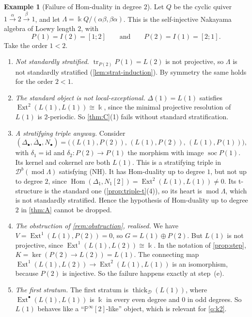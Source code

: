 \documentclass[11pt,reqno]{amsart}
\theoremstyle{plain}
\theoremstyle{definition}
\newtheorem{example}[theorem]{Example}
\theoremstyle{remark}
\newcommand{\kk}{\Bbbk}
\DeclareMathOperator{\Hom}{Hom}
\DeclareMathOperator{\Ext}{Ext}
\DeclareMathOperator{\soc}{soc}
\DeclareMathOperator{\tr}{tr}
\newcommand{\modd}{\operatorname{mod}}
\newcommand{\Db}{\mathcal{D}^b}
\newcommand{\thick}[2][\cD]{\operatorname{thick}_{#1}(#2)}
\newcommand{\Pn}[2]{\mathbb{P}^{#1}[#2]}
\newcommand{\Deltabar}{\overline{\Delta}}
\newcommand{\cD}{\mathcal{D}}
\begin{document}
\begin{example}[Failure of Hom-duality in degree $2$]\label{ex:nakayama}
Let $Q$ be the cyclic quiver $1\xrightarrow{\alpha}2\xrightarrow{\beta}1$, and let $\Lambda=\kk Q/(\alpha\beta,\beta\alpha)$. This is the self-injective Nakayama algebra of Loewy length $2$, with
\[P(1)=I(2)=[1;2]\qquad\text{and}\qquad P(2)=I(1)=[2;1].\]
Take the order $1<2$.
\begin{enumerate}
\item \emph{Not standardly stratified.} $\tr_{P(2)}P(1)=L(2)$ is not projective, so $\Lambda$ is not standardly stratified (\cref{lem:strat-induction}). By symmetry the same holds for the order $2<1$.
\item \emph{The standard object is not local-exceptional.} $\Delta(1)=L(1)$ satisfies $\Ext^2(L(1),L(1))\cong\kk$, since the minimal projective resolution of $L(1)$ is $2$-periodic. So \cref{thm:C}(1) fails without standard stratification.
\item \emph{A stratifying triple anyway.} Consider
\[(\Delta_\bullet,\Deltabar_\bullet,N_\bullet)=\big((L(1),P(2)),\,(L(1),P(2)),\,(L(1),P(1))\big),\]
with $\delta_1=\mathrm{id}$ and $\delta_2\colon P(2)\to P(1)$ the morphism with image $\soc P(1)$. Its kernel and cokernel are both $L(1)$. This is a stratifying triple in $\Db(\modd\Lambda)$ satisfying (NH). It has Hom-duality up to degree $1$, but not up to degree $2$, since $\Hom(\Delta_1,N_1[2])=\Ext^2(L(1),L(1))\ne0$. Its t-structure is the standard one (\cref{prop:triple-t}(4)), so its heart is $\modd\Lambda$, which is not standardly stratified. Hence the hypothesis of Hom-duality up to degree $2$ in \cref{thm:A} cannot be dropped.
\item \emph{The obstruction of \cref{rem:obstruction}, realised.} We have $V=\Ext^1(L(1),P(2))=0$, so $G=L(1)\oplus P(2)$. But $L(1)$ is not projective, since $\Ext^1(L(1),L(2))\cong\kk$. In the notation of \cref{prop:step}, $K=\ker(P(2)\to L(2))=L(1)$. The connecting map $\Ext^1(L(1),L(2))\to\Ext^2(L(1),L(1))$ is an isomorphism, because $P(2)$ is injective. So the failure happens exactly at step~(e).
\item \emph{The first stratum.} The first stratum is $\thick{L(1)}$, where $\Ext^\bullet(L(1),L(1))$ is $\kk$ in every even degree and $0$ in odd degrees. So $L(1)$ behaves like a ``$\Pn\infty2$-like'' object, which is relevant for \cref{q:k2}.
\end{enumerate}
\end{example}
\end{document}
